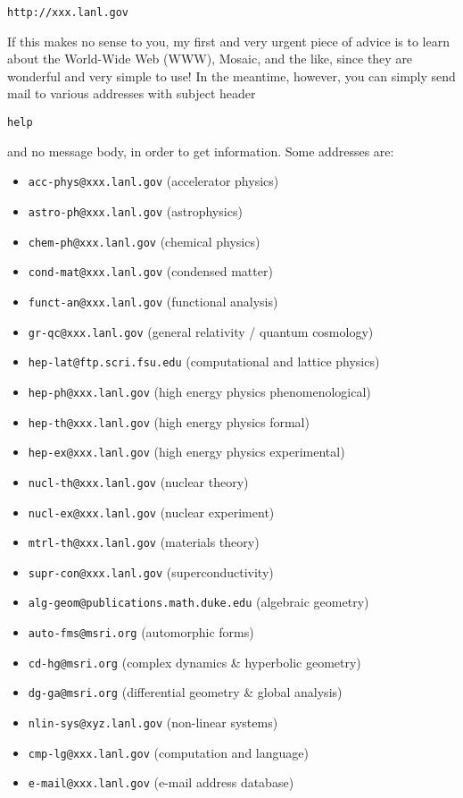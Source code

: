 \documentclass{article}
\begin{document}
\begin{verbatim}
http://xxx.lanl.gov
\end{verbatim}

If this makes no sense to you, my first and very urgent piece of advice
is to learn about the World-Wide Web (WWW), Mosaic, and the like, since
they are wonderful and very simple to use! In the meantime, however, you
can simply send mail to various addresses with subject header

\begin{verbatim}
help
\end{verbatim}

and no message body, in order to get information. Some addresses are:

\begin{itemize}
\item
  \texttt{acc-phys@xxx.lanl.gov} (accelerator physics)
\item
  \texttt{astro-ph@xxx.lanl.gov} (astrophysics)
\item
  \texttt{chem-ph@xxx.lanl.gov} (chemical physics)
\item
  \texttt{cond-mat@xxx.lanl.gov} (condensed matter)
\item
  \texttt{funct-an@xxx.lanl.gov} (functional analysis)
\item
  \texttt{gr-qc@xxx.lanl.gov} (general relativity / quantum cosmology)
\item
  \texttt{hep-lat@ftp.scri.fsu.edu} (computational and lattice physics)
\item
  \texttt{hep-ph@xxx.lanl.gov} (high energy physics phenomenological)
\item
  \texttt{hep-th@xxx.lanl.gov} (high energy physics formal)
\item
  \texttt{hep-ex@xxx.lanl.gov} (high energy physics experimental)
\item
  \texttt{nucl-th@xxx.lanl.gov} (nuclear theory)
\item
  \texttt{nucl-ex@xxx.lanl.gov} (nuclear experiment)
\item
  \texttt{mtrl-th@xxx.lanl.gov} (materials theory)
\item
  \texttt{supr-con@xxx.lanl.gov} (superconductivity)
\item
  \texttt{alg-geom@publications.math.duke.edu} (algebraic geometry)
\item
  \texttt{auto-fms@msri.org} (automorphic forms)
\item
  \texttt{cd-hg@msri.org} (complex dynamics \& hyperbolic geometry)
\item
  \texttt{dg-ga@msri.org} (differential geometry \& global analysis)
\item
  \texttt{nlin-sys@xyz.lanl.gov} (non-linear systems)
\item
  \texttt{cmp-lg@xxx.lanl.gov} (computation and language)
\item
  \texttt{e-mail@xxx.lanl.gov} (e-mail address database)
\end{itemize}
\end{document}
